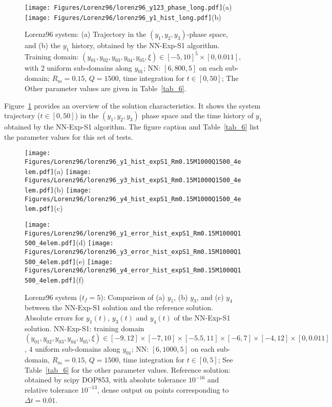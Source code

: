 \begin{figure}
  \centerline{
    \texttt{[image: Figures/Lorenz96/lorenz96\_y123\_phase\_long.pdf]}(a)
    \texttt{[image: Figures/Lorenz96/lorenz96\_y1\_hist\_long.pdf]}(b)
  }
  \caption{Lorenz96 system: (a) Trajectory in the $(y_1,y_2,y_3)$-phase space, and (b)
    the $y_1$ history, obtained by the NN-Exp-S1 algorithm.
    Training domain: $(y_{01},y_{02},y_{03},y_{04},y_{05},\xi)\in[-5,10]^5\times[0,0.011]$,
    with 2 uniform sub-domains along $y_{01}$;
    NN: $[6,800,5]$ on each sub-domain;
    $R_m=0.15$, $Q=1500$,  time integration for $t\in[0,50]$;
    The Other parameter values
    are given in Table~\ref{tab_6}.
  }
  \label{fg_26}
\end{figure}

Figure~\ref{fg_26} provides an overview of the solution characteristics.
It shows the system trajectory  ($t\in[0,50]$) in
the $(y_1,y_2,y_3)$ phase space and the time history of $y_1$ obtained by
the NN-Exp-S1 algorithm. The figure caption and Table~\ref{tab_6} list
the parameter values for this set of tests. 


\begin{figure}
  \centerline{
    \texttt{[image: Figures/Lorenz96/lorenz96\_y1\_hist\_expS1\_Rm0.15M1000Q1500\_4elem.pdf]}(a)
    \texttt{[image: Figures/Lorenz96/lorenz96\_y3\_hist\_expS1\_Rm0.15M1000Q1500\_4elem.pdf]}(b)
    \texttt{[image: Figures/Lorenz96/lorenz96\_y4\_hist\_expS1\_Rm0.15M1000Q1500\_4elem.pdf]}(c)
  }
  \centerline{
    \texttt{[image: Figures/Lorenz96/lorenz96\_y1\_error\_hist\_expS1\_Rm0.15M1000Q1500\_4elem.pdf]}(d)
    \texttt{[image: Figures/Lorenz96/lorenz96\_y3\_error\_hist\_expS1\_Rm0.15M1000Q1500\_4elem.pdf]}(e)
    \texttt{[image: Figures/Lorenz96/lorenz96\_y4\_error\_hist\_expS1\_Rm0.15M1000Q1500\_4elem.pdf]}(f)
  }
  \caption{Lorenz96 system ($t_f=5$): Comparison 
    of (a) $y_1$, (b) $y_3$, and (c) $y_4$ between the NN-Exp-S1 solution and
    the reference solution. Absolute errors for
    $y_1(t)$, $y_3(t)$ and $y_4(t)$ of the NN-Exp-S1 solution.
    NN-Exp-S1: training domain $(y_{01},y_{02},y_{03},y_{04},y_{05},\xi)\in[-9,12]\times[-7,10]\times[-5.5,11]\times[-6,7]\times[-4,12]\times[0,0.011]$, $4$ uniform sub-domains
    along $y_{01}$;
    NN: $[6,1000,5]$ on each sub-domain,
    $R_m=0.15$, $Q=1500$, time integration for $t\in[0,5]$; See Table~\ref{tab_6}
    for the other parameter values.
    Reference solution: obtained by scipy DOP853, with
    absolute tolerance $10^{-16}$ and relative tolerance $10^{-13}$,
    dense output on points corresponding to $\Delta t=0.01$.
  }
  \label{fg_27}
\end{figure}


